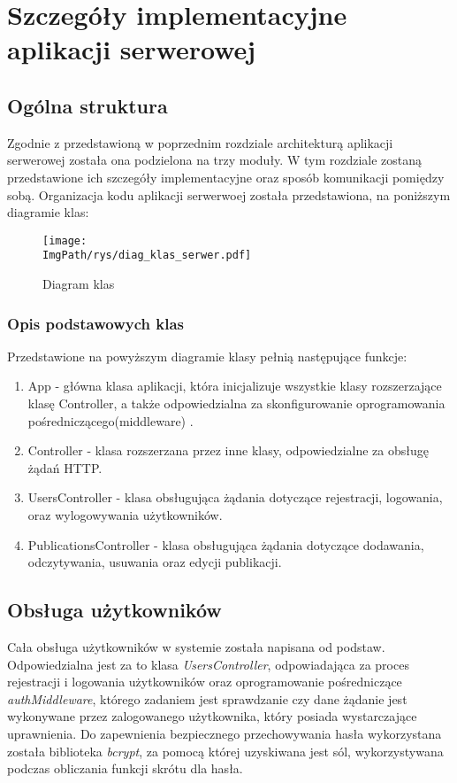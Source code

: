 \documentclass[a4paper,12pt,twoside,openany]{report}
\newcommand{\ImgPath}{.}
\begin{document}
\chapter{Szczegóły implementacyjne aplikacji serwerowej}
\section{Ogólna struktura}
Zgodnie z przedstawioną w poprzednim rozdziale architekturą aplikacji serwerowej została ona podzielona na trzy moduły. W tym rozdziale zostaną przedstawione ich szczegóły implementacyjne oraz sposób komunikacji pomiędzy sobą. Organizacja kodu aplikacji serwerwoej została przedstawiona, na poniższym diagramie klas:

 \begin{figure}[!htbp]
	\begin{center}
		\centering
		\texttt{[image: \\ImgPath/rys/diag\_klas\_serwer.pdf]}
	\end{center}
	\caption{Diagram klas}
	\label{diagramKlas}
\end{figure}
\subsection{Opis podstawowych klas}
Przedstawione na powyższym diagramie klasy pełnią następujące funkcje:
\begin{enumerate}
	\item App - główna klasa aplikacji, która inicjalizuje wszystkie klasy rozszerzające klasę Controller, a także odpowiedzialna za skonfigurowanie oprogramowania pośredniczącego(middleware) .
	
	\item Controller - klasa rozszerzana przez inne klasy, odpowiedzialne za obsługę żądań  HTTP.
	
	\item UsersController - klasa obsługująca żądania dotyczące rejestracji, logowania, oraz wylogowywania użytkowników.
	
	\item PublicationsController - klasa obsługująca żądania dotyczące dodawania, odczytywania, usuwania oraz edycji publikacji.
	
\end{enumerate}

\section{Obsługa użytkowników}
Cała obsługa użytkowników w systemie została napisana od podstaw. Odpowiedzialna jest za to klasa \textit{UsersController}, odpowiadająca za proces rejestracji i logowania użytkowników oraz oprogramowanie pośredniczące \textit{authMiddleware}, którego zadaniem jest sprawdzanie czy dane żądanie jest wykonywane przez zalogowanego użytkownika, który posiada wystarczające uprawnienia. Do zapewnienia bezpiecznego przechowywania hasła wykorzystana została biblioteka \textit{bcrypt}, za pomocą której uzyskiwana jest sól, wykorzystywana podczas obliczania funkcji skrótu dla hasła. 
\end{document}
